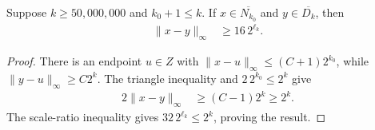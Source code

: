 \begin{lemma}
    \label{thm:area_law_dummy_fine_scale_separation}
    \leanok
    Suppose $k\ge 50{,}000{,}000$ and $k_0+1\le k$. If
    $x\in\overline{N_{k_0}}$ and $y\in\overline{D_k}$, then
    \begin{align}
        \|x-y\|_\infty & \ge 16\,2^{\ell_k}.
    \end{align}
\end{lemma}
\begin{proof}\leanok
    There is an endpoint $u\in Z$ with
    $\|x-u\|_\infty\le(C+1)2^{k_0}$, while
    $\|y-u\|_\infty\ge C2^k$. The triangle inequality and
    $2\,2^{k_0}\le2^k$ give
    \begin{align}
        2\|x-y\|_\infty & \ge(C-1)2^k\ge2^k.
    \end{align}
    The scale-ratio inequality gives
    $32\,2^{\ell_k}\le2^k$, proving the result.
\end{proof}
